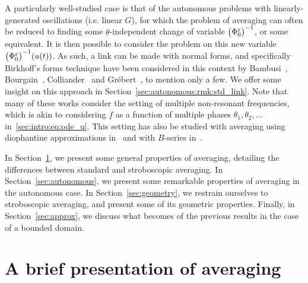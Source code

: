 \medskip%
A particularly well-studied case is that of the autonomous problems with
linearly-generated oscillations (i.e. linear $G$), for which the problem
of averaging can often be reduced to finding some $\theta$-independent
change of variable $\big( \Phi^{\varepsilon}_0 \big) ^{-1}$, or some equivalent. It
is then possible to consider the problem on this new variable
$\big(\Phi^{\varepsilon}_0 \big)^{-1} (u(t))$. As such, a link can be made with
normal forms, and specifically Birkhoff's forms technique have been
considered in this context by Bambusi~\cite{bambusi.2003.birkhoff, bambusi.2005.birkhoff-lewis, bambusi.2006.birkhoff, bambusi.2008.birkhoff},
Bourgain~\cite{bourgain.1996.construction},
Colliander~\cite{colliander.2010.transfer, colliander.2012.remark} and
Grébert~\cite{bambusi.2006.birkhoff, grebert.2011.energy,
grebert.2012.resonant}, to mention only a few. We offer some insight on
this approach in Section~\ref{sec:autonomous:rmk:std_link}.
%
Note that many of these works consider the setting of multiple
non-resonant frequencies, which is akin to considering $f$ as a function
of multiple phases $\theta_1, \theta_2, \ldots$
in~\eqref{sec:intro:eq:ode_u}. This setting has also be studied with
averaging using diophantine approximations
in~\cite{chartier.2017.convergence} and with $B$-series
in~\cite{chartier.2012.higher}. 

\bigskip %
In Section~\ref{sec:presentation}, we present some general properties of
averaging, detailing the differences between standard and stroboscopic
averaging. In Section~\ref{sec:autonomous}, we present some remarkable
properties of averaging in the autonomous case. In
Section~\ref{sec:geometry}, we restrain ourselves to stroboscopic
averaging, and present some of its geometric properties. Finally, in
Section~\ref{sec:approx}, we discuss what becomes of the previous results
in the case of a bounded domain. 


\section{A brief presentation of averaging} \label{sec:presentation}


